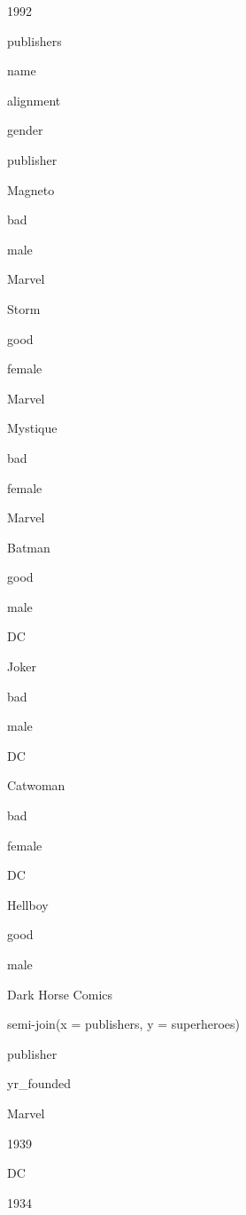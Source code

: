 1992
 


publishers
 


name
 
alignment
 
gender
 
publisher
 



Magneto
 
bad
 
male
 
Marvel
 


Storm
 
good
 
female
 
Marvel
 


Mystique
 
bad
 
female
 
Marvel
 


Batman
 
good
 
male
 
DC
 


Joker
 
bad
 
male
 
DC
 


Catwoman
 
bad
 
female
 
DC
 


Hellboy
 
good
 
male
 
Dark Horse Comics
 


semi-join(x = publishers, y = superheroes)
 


publisher
 
yr_founded
 



Marvel
 
1939
 


DC
 
1934
 



